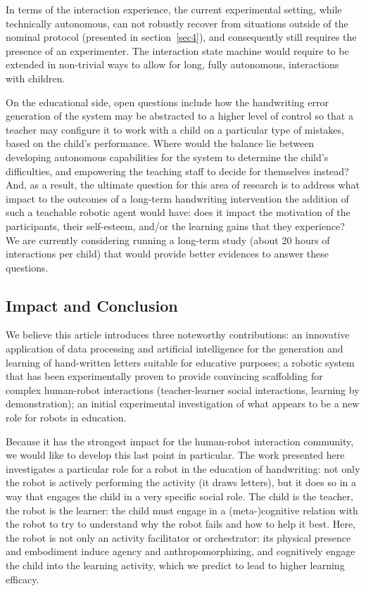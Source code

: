 \documentclass{sig-alternate}
\begin{document}
In terms of the interaction experience, the current experimental setting, while
technically autonomous, can not robustly recover from situations outside of the
nominal protocol (presented in section~\ref{sec4}), and consequently still requires the
presence of an experimenter. The interaction state machine would require to be
extended in non-trivial ways to allow for long, fully autonomous, interactions
with children.


On the educational side, open questions include how the handwriting error
generation of the system may be abstracted to a higher level of control so that
a teacher may configure it to work with a child on a particular type of
mistakes, based on the child's performance. Where would the balance lie between
developing autonomous capabilities for the system to determine the child's
difficulties, and empowering the teaching staff to decide for themselves
instead? And, as a result, the ultimate question for this area of research is
to address what impact to the outcomes of a long-term handwriting intervention the
addition of such a teachable robotic agent would have: does it impact the
motivation of the participants, their self-esteem, and/or the learning gains
that they experience? We are currently considering running a long-term study
(about 20 hours of interactions per child) that would provide better evidences
to answer these questions.

\subsection{Impact and Conclusion}

We believe this article introduces three noteworthy contributions: an innovative
application of data processing and artificial intelligence for the generation and
learning of hand-written letters suitable for educative purposes; a robotic
system that has been experimentally proven to provide convincing scaffolding for
complex human-robot interactions (teacher-learner social interactions, learning by
demonstration); an initial experimental investigation of what appears to be a
new role for robots in education.

Because it has the strongest impact for the human-robot interaction community,
we would like to develop this last point in particular. The work presented here
investigates a particular role for a robot in the education of handwriting: not
only the robot is actively performing the activity (it draws letters), but it
does so in a way that engages the child in a very specific social role. The child
is the teacher, the robot is the learner: the child must engage in a
(meta-)cognitive relation with the robot to try to understand why the
robot fails and how to help it best.  Here, the robot is not only an activity
facilitator or orchestrator: its physical presence and embodiment induce agency
and anthropomorphizing, and cognitively engage the child into the learning
activity, which we predict to lead to higher learning efficacy.
\end{document}
